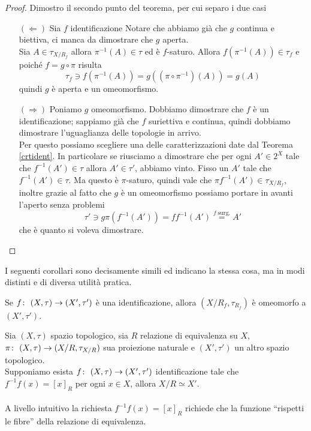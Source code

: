 \begin{proof}
	Dimostro il secondo punto del teorema, per cui separo i due casi
	\begin{enumerate}
		\item[$(\Leftarrow)$] Sia $f$ identificazione Notare che abbiamo già che $g$ continua e biettiva, ci manca da dimostrare che $g$ aperta. \\ Sia $A \in \tau_{X/R_f}$ allora $\pi^{-1}(A) \in \tau$ ed è $f$-saturo. Allora $f(\pi^{-1}(A)) \in \tau_f$ e poiché $f = g \circ \pi$ risulta 
		\begin{equation*}
			 \tau_f \ni f(\pi^{-1}(A)) = g ((\pi \circ \pi^{-1})(A)) = g(A)
		\end{equation*}
		quindi $g$ è aperta e un omeomorfismo.
		\item[$(\Rightarrow)$] Poniamo $g$ omeomorfismo. Dobbiamo dimostrare che $f$ è un identificazione; sappiamo già che $f$ suriettiva e continua, quindi dobbiamo dimostrare l'uguaglianza delle  topologie in arrivo. \\ Per questo possiamo scegliere una delle caratterizzazioni date dal Teorema \ref{crtident}. In particolare se riusciamo a dimostrare che per ogni $A' \in 2^X$ tale che $f^{-1}(A') \in \tau$ allora $A' \in \tau'$, abbiamo vinto. Fisso un $A'$ tale che $f^{-1}(A') \in \tau$. Ma questo è $\pi$-saturo, quindi vale che $\pi f^{-1} (A') \in \tau_{X/R_f}$, inoltre grazie al fatto che $g$ è un omeomorfismo possiamo portare in avanti l'aperto senza problemi
		\begin{equation*}
			\tau' \ni g\pi (f^{-1}(A')) = ff^{-1}(A') \overset{f \; \text{surg.}}{=} A' 
		\end{equation*}
		che è quanto si voleva dimostrare.
	\end{enumerate}
\end{proof}

I seguenti corollari sono decisamente simili ed indicano la stessa cosa, ma in modi distinti e di diversa utilità pratica. 

\begin{corollary}
	Se $f \colon\ (X,\tau) \rightarrow (X',\tau')$ è una identificazione, allora $(X/R_f, \tau_{R_f})$ è omeomorfo a $(X', \tau')$. 
\end{corollary}

\begin{corollary}
	Sia $(X,\tau)$ spazio topologico, sia $R$ relazione di equivalenza su $X$, $\pi \colon\ (X,\tau) \rightarrow (X/R, \tau_{X/R})$ sua proiezione naturale e $(X', \tau')$ un altro spazio topologico. \\ Supponiamo esista $f \colon\ (X,\tau) \rightarrow (X',\tau')$ identificazione tale che $f^{-1}f(x) = \left[x\right]_R$ per ogni $x \in X$, allora $X/R \simeq X'$. \\ \\ A livello intuitivo la richiesta $f^{-1}f(x) = \left[x\right]_R$ richiede che la funzione \enquote{rispetti le fibre} della relazione di equivalenza.
\end{corollary}




